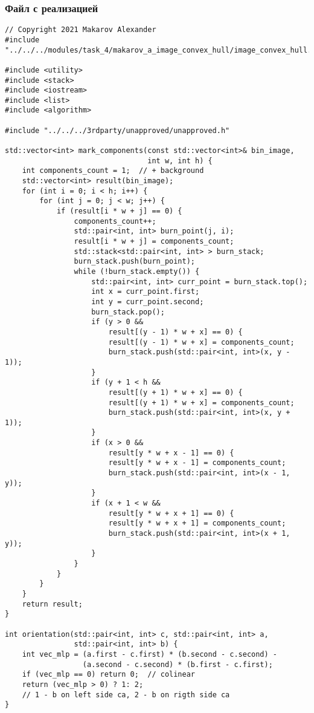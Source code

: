 \documentclass{report}
\begin{document}
\subsubsection{Файл с реализацией}
\begin{lstlisting}
// Copyright 2021 Makarov Alexander
#include "../../../modules/task_4/makarov_a_image_convex_hull/image_convex_hull.h"

#include <utility>
#include <stack>
#include <iostream>
#include <list>
#include <algorithm>

#include "../../../3rdparty/unapproved/unapproved.h"

std::vector<int> mark_components(const std::vector<int>& bin_image,
                                 int w, int h) {
    int components_count = 1;  // + background
    std::vector<int> result(bin_image);
    for (int i = 0; i < h; i++) {
        for (int j = 0; j < w; j++) {
            if (result[i * w + j] == 0) {
                components_count++;
                std::pair<int, int> burn_point(j, i);
                result[i * w + j] = components_count;
                std::stack<std::pair<int, int> > burn_stack;
                burn_stack.push(burn_point);
                while (!burn_stack.empty()) {
                    std::pair<int, int> curr_point = burn_stack.top();
                    int x = curr_point.first;
                    int y = curr_point.second;
                    burn_stack.pop();
                    if (y > 0 &&
                        result[(y - 1) * w + x] == 0) {
                        result[(y - 1) * w + x] = components_count;
                        burn_stack.push(std::pair<int, int>(x, y - 1));
                    }
                    if (y + 1 < h &&
                        result[(y + 1) * w + x] == 0) {
                        result[(y + 1) * w + x] = components_count;
                        burn_stack.push(std::pair<int, int>(x, y + 1));
                    }
                    if (x > 0 &&
                        result[y * w + x - 1] == 0) {
                        result[y * w + x - 1] = components_count;
                        burn_stack.push(std::pair<int, int>(x - 1, y));
                    }
                    if (x + 1 < w &&
                        result[y * w + x + 1] == 0) {
                        result[y * w + x + 1] = components_count;
                        burn_stack.push(std::pair<int, int>(x + 1, y));
                    }
                }
            }
        }
    }
    return result;
}

int orientation(std::pair<int, int> c, std::pair<int, int> a,
                std::pair<int, int> b) {
    int vec_mlp = (a.first - c.first) * (b.second - c.second) -
                  (a.second - c.second) * (b.first - c.first);
    if (vec_mlp == 0) return 0;  // colinear
    return (vec_mlp > 0) ? 1: 2;
    // 1 - b on left side ca, 2 - b on rigth side ca
}


\end{lstlisting}
\end{document}
